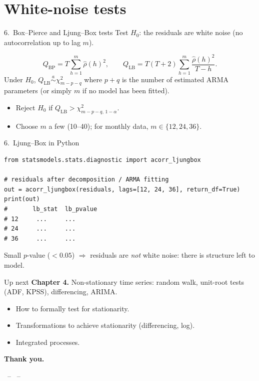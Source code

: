 \documentclass[aspectratio=169]{beamer}
\begin{document}
\section{White-noise tests}

\begin{frame}{6.~Box--Pierce and Ljung--Box tests}
  Test $H_0$: the residuals are white noise (no autocorrelation up to
  lag $m$).
  \medskip
  \begin{defbox}
    \[
      Q_{\text{BP}} = T \sum_{h = 1}^{m} \widehat\rho(h)^2,
      \qquad
      Q_{\text{LB}} = T(T + 2) \sum_{h = 1}^{m} \frac{\widehat\rho(h)^2}{T - h}.
    \]
    Under $H_0$, $Q_{\text{LB}} \overset{a}{\sim} \chi^2_{m - p - q}$
    where $p + q$ is the number of estimated ARMA parameters
    (or simply $m$ if no model has been fitted).
  \end{defbox}
  \medskip
  \begin{itemize}
    \item Reject $H_0$ if $Q_{\text{LB}} > \chi^2_{m - p - q,\, 1 - \alpha}$.
    \item Choose $m$ a few (10--40); for monthly data, $m \in \{12, 24, 36\}$.
  \end{itemize}
\end{frame}

\begin{frame}[fragile]{6.~Ljung--Box in Python}
\begin{lstlisting}
from statsmodels.stats.diagnostic import acorr_ljungbox

# residuals after decomposition / ARMA fitting
out = acorr_ljungbox(residuals, lags=[12, 24, 36], return_df=True)
print(out)
#       lb_stat  lb_pvalue
# 12     ...     ...
# 24     ...     ...
# 36     ...     ...
\end{lstlisting}
  \medskip
  Small $p$-value ($< 0.05$) $\Rightarrow$ residuals are \emph{not}
  white noise: there is structure left to model.
\end{frame}

\begin{frame}{Up next}
  \textbf{Chapter 4.} Non-stationary time series: random walk,
  unit-root tests (ADF, KPSS), differencing, ARIMA.
  \medskip
  \begin{itemize}
    \item How to formally test for stationarity.
    \item Transformations to achieve stationarity (differencing, log).
    \item Integrated processes.
  \end{itemize}
  \medskip
  \begin{center}\Large\bfseries Thank you.\end{center}
  \begin{center}\footnotesize\auteurNom\ -- \auteurEmail\ -- \auteurInstitution\end{center}
\end{frame}
\end{document}
